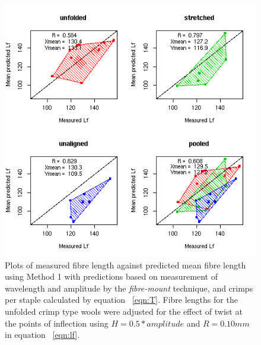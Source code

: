 %

\begin{figure}[!h]
  \centering
  \includegraphics[width=1.1\textwidth]{figfcpredlftc.png}
  \caption{Plots of measured fibre length against predicted mean fibre length using Method 1 with predictions based on measurement of wavelength and amplitude by the {\em fibre-mount} technique, and crimps per staple calculated by equation ~\ref{eqn:T}. Fibre lengths for the unfolded crimp type wools were adjusted for the effect of twist at the points of inflection using $H = 0.5 * amplitude$ and $R = 0.10 mm$ in equation ~\ref{eqn:lf}.}
  \label{fig:fcpredlftc}
\end{figure}

%

